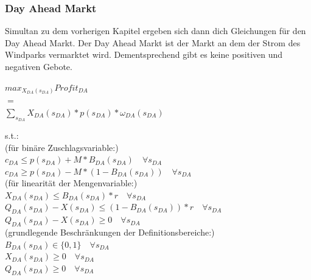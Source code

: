 \documentclass{article}
\begin{document}


\subsubsection{Day Ahead Markt}
Simultan zu dem vorherigen Kapitel ergeben sich dann dich Gleichungen für den Day Ahead Markt.
Der Day Ahead Markt ist der Markt an dem der Strom des Windparks vermarktet wird. Dementsprechend gibt es keine positiven und negativen Gebote.

\begin{center}
$max_{X_{DA}(s_{DA})} Profit_{DA}$\\ 
$=$\\
$\sum_{s_{DA}} X_{DA}(s_{DA}) * p(s_{DA}) * \omega_{DA}(s_{DA})$\\

\end{center}
s.t.:\\
(für binäre Zuschlagsvariable:)\\
$c_{DA} \leq p(s_{DA}) + M * B_{DA}(s_{DA})\quad\forall s_{DA} $ \\
$c_{DA} \geq p(s_{DA}) - M * (1 - B_{DA}(s_{DA}))\quad\forall s_{DA} $ \\
(für linearität der Mengenvariable:)\\
$X_{DA}(s_{DA}) \leq B_{DA}(s_{DA}) * r \quad\forall s_{DA}$\\
$Q_{DA}(s_{DA}) - X(s_{DA}) \leq (1 - B_{DA}(s_{DA})) * r \quad\forall s_{DA}$\\
$Q_{DA}(s_{DA}) - X(s_{DA}) \geq 0 \quad\forall s_{DA}$\\
(grundlegende Beschränkungen der Definitionsbereiche:)\\
$B_{DA}(s_{DA})\in \{0,1\}\quad\forall s_{DA} $\\
$X_{DA}(s_{DA}) \geq 0 \quad\forall s_{DA} $\\
$Q_{DA}(s_{DA}) \geq 0\quad\forall  s_{DA} $\\
\end{document}
